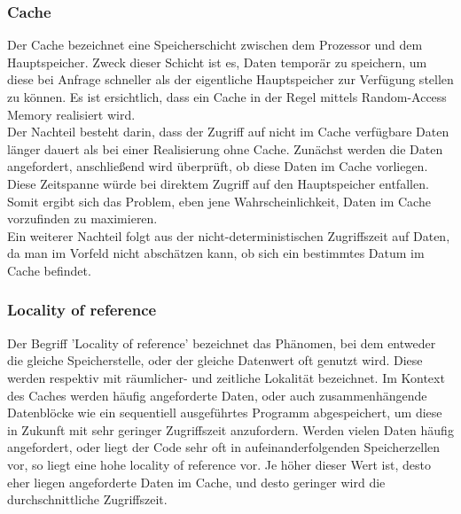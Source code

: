 \subsubsection{Cache}
Der Cache bezeichnet eine Speicherschicht zwischen dem Prozessor und dem Hauptspeicher. Zweck dieser Schicht ist es, Daten temporär zu speichern, um diese bei Anfrage schneller als der eigentliche Hauptspeicher zur Verfügung stellen zu können. Es ist ersichtlich, dass ein Cache in der Regel mittels Random-Access Memory realisiert wird.\\
Der Nachteil besteht darin, dass der Zugriff auf nicht im Cache verfügbare Daten länger dauert als bei einer Realisierung ohne Cache. Zunächst werden die Daten angefordert, anschließend wird überprüft, ob diese Daten im Cache vorliegen. Diese Zeitspanne würde bei direktem Zugriff auf den Hauptspeicher entfallen. Somit ergibt sich das Problem, eben jene Wahrscheinlichkeit, Daten im Cache vorzufinden zu maximieren.\\
Ein weiterer Nachteil folgt aus der nicht-deterministischen Zugriffszeit auf Daten, da man im Vorfeld nicht abschätzen kann, ob sich ein bestimmtes Datum im Cache befindet.

\subsubsection{Locality of reference}
Der Begriff 'Locality of reference' bezeichnet das Phänomen, bei dem entweder die gleiche Speicherstelle, oder der gleiche Datenwert oft genutzt wird. Diese werden respektiv mit räumlicher- und zeitliche Lokalität bezeichnet. Im Kontext des Caches werden häufig angeforderte Daten, oder auch zusammenhängende Datenblöcke wie ein sequentiell ausgeführtes Programm abgespeichert, um diese in Zukunft mit sehr geringer Zugriffszeit anzufordern. Werden vielen Daten häufig angefordert, oder liegt der Code sehr oft in aufeinanderfolgenden Speicherzellen vor, so liegt eine hohe locality of reference vor. Je höher dieser Wert ist, desto eher liegen angeforderte Daten im Cache, und desto geringer wird die durchschnittliche Zugriffszeit.

